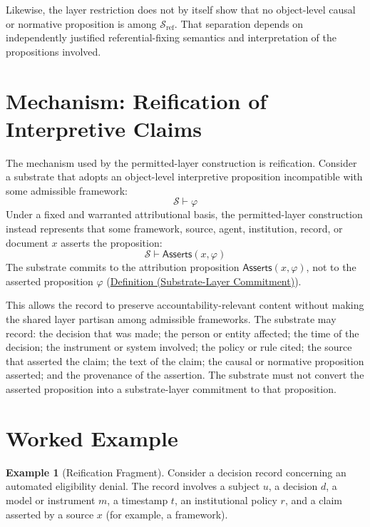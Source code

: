 \documentclass[11pt]{article}
\theoremstyle{plain}
\theoremstyle{definition}
\newtheorem{example}[theorem]{Example}
\theoremstyle{remark}
\newcommand{\DefRef}[2]{\hyperref[#1]{Definition (#2)}}
\newcommand{\Substrate}{\mathcal{S}}
\newcommand{\SubstrateRef}{\mathcal{S}_{\mathrm{ref}}}
\newcommand{\entails}{\vdash}
\newcommand{\Asserts}{\mathsf{Asserts}}
\begin{document}
Likewise, the layer restriction does not by itself show that no
object-level causal or normative proposition is among
$\SubstrateRef$.
That separation depends on independently justified referential-fixing
semantics and interpretation of the propositions involved.

\section{Mechanism: Reification of Interpretive Claims}
\label{sec:mechanism}

The mechanism used by the permitted-layer construction is reification.
Consider a substrate that adopts an object-level interpretive proposition
incompatible with some admissible framework:
\[
  \Substrate \entails \varphi
\]
Under a fixed and warranted attributional basis,
the permitted-layer construction instead represents
that some framework, source, agent, institution, record, or document $x$
asserts the proposition:
\[
  \Substrate \entails \Asserts(x,\varphi)
\]
The substrate commits to the attribution proposition
$\Asserts(x,\varphi)$,
not to the asserted proposition $\varphi$
(\DefRef{se100.def.SubstrateCommitment}{Substrate-Layer Commitment}).

This allows the record to preserve accountability-relevant content without
making the shared layer partisan among admissible frameworks.
The substrate may record:
the decision that was made;
the person or entity affected;
the time of the decision;
the instrument or system involved;
the policy or rule cited;
the source that asserted the claim;
the text of the claim;
the causal or normative proposition asserted;
and the provenance of the assertion.
The substrate must not convert the asserted proposition into a
substrate-layer commitment to that proposition.

\section{Worked Example}
\label{sec:example}

\begin{example}[Reification Fragment]
  \label{se100.example.ReificationFragment}
  Consider a decision record concerning an automated eligibility denial.
  The record involves a subject $u$, a decision $d$, a model or instrument $m$,
  a timestamp $t$, an institutional policy $r$, and
  a claim asserted by a source $x$ (for example, a framework).
\end{example}
\end{document}
